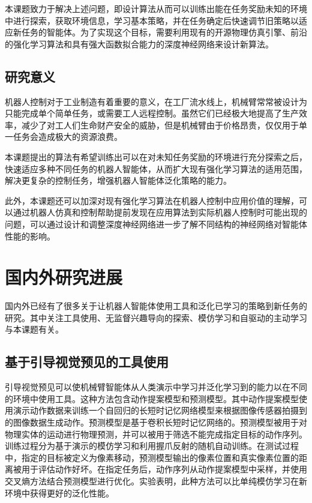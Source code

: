         本课题致力于解决上述问题，即设计算法从而可以训练出能在任务奖励未知的环境中进行探索，获取环境信息，学习基本策略，并在任务确定后快速调节旧策略以适应新任务的智能体。为了实现这个目标，需要利用现有的开源物理仿真引擎、前沿的强化学习算法和具有强大函数拟合能力的深度神经网络来设计新算法。
        
        \subsection{研究意义}

        机器人控制对于工业制造有着重要的意义，在工厂流水线上，机械臂常常被设计为只能完成单个简单任务，或需要工人远程控制。虽然它们已经极大地提高了生产效率，减少了对工人们生命财产安全的威胁，但是机械臂由于价格昂贵，仅仅用于单一任务会造成极大的资源浪费。

        本课题提出的算法有希望训练出可以在对未知任务奖励的环境进行充分探索之后，快速适应多种不同任务的机器人智能体，从而扩大现有强化学习算法的适用范围，解决更复杂的控制任务，增强机器人智能体泛化策略的能力。

        此外，本课题还可以加深对现有强化学习算法在机器人控制中应用价值的理解，可以通过机器人仿真和控制帮助提前发现在应用算法到实际机器人控制时可能出现的问题，可以通过设计和调整深度神经网络进一步了解不同结构的神经网络对智能体性能的影响。
    
    \section{国内外研究进展}

    国内外已经有了很多关于让机器人智能体使用工具和泛化已学习的策略到新任务的研究。其中关注工具使用、无监督兴趣导向的探索、模仿学习和自驱动的主动学习与本课题有关。
        \subsection{基于引导视觉预见的工具使用}
        引导视觉预见\cite{xie2019improvisation}可以使机械臂智能体从人类演示中学习并泛化学习到的能力以在不同的环境中使用工具。这种方法包含动作提案模型和预测模型。其中动作提案模型使用演示动作数据来训练一个自回归的长短时记忆网络模型来根据图像传感器拍摄到的图像数据生成动作。预测模型是基于卷积长短时记忆网络的\cite{shi2015convolutional}。预测模型被用于对物理实体的运动进行物理预测，并可以被用于筛选不能完成指定目标的动作序列。训练过程分为基于演示的模仿学习和利用握爪反射的随机自动训练。在测试过程中，指定的目标被定义为像素移动，预测模型输出的像素位置和真实像素位置的距离被用于评估动作好坏。在指定任务后，动作序列从动作提案模型中采样，并使用交叉熵方法结合预测模型进行优化。实验表明，此种方法可以比单纯模仿学习在新环境中获得更好的泛化性能。

